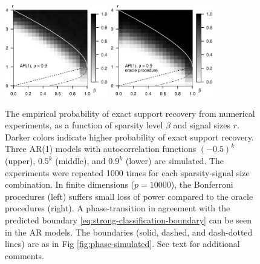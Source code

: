 \begin{figure}
    \includegraphics[width=0.4\textwidth]{./figures/simulated_phase_diagram_AR09_p10000.eps}
    \includegraphics[width=0.4\textwidth]{./figures/simulated_phase_diagram_AR09_p10000_oracle.eps}
    \caption{The empirical probability of exact support recovery from numerical experiments, as a function of sparsity level $\beta$ and signal sizes $r$. Darker colors indicate higher probability of exact support recovery. 
    Three AR(1) models with autocorrelation functions $(-0.5)^k$ (upper), 
    $0.5^k$ (middle), and $0.9^k$ (lower) are simulated.
    The experiments were repeated 1000 times for each sparsity-signal size combination.
    In finite dimensions ($p=10000$), the Bonferroni procedures (left) suffers small loss of power compared to the oracle procedures (right).
    A phase-transition in agreement with the predicted boundary \eqref{eq:strong-classification-boundary} can be seen in the AR models.
    The boundaries (solid, dashed, and dash-dotted lines) are as in Fig \ref{fig:phase-simulated}.
    See text for additional comments.}
    \label{fig:phase-simulated-dependent}
\end{figure}

